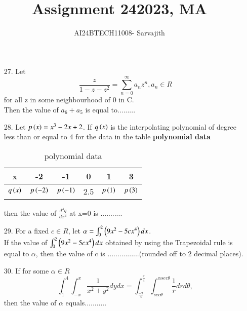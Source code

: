 \documentclass[journal]{IEEEtran}
\begin{document}

\vspace{3cm}


\author{AI24BTECH11008- Sarvajith
}
\title{Assignment 24}
{\let\newpage\relax\maketitle}
\title{2023, MA}
\renewcommand{\thefigure}{\theenumi}
\renewcommand{\thetable}{\theenumi}
\setlength{\intextsep}{10pt} %
\renewcommand{\thetable}{\theenumi}
\begin{enumerate}
    \item[27.] Let $$\frac{z}{1-z-z^2} = \sum_{n=0}^{\infty}a_nz^n, a_n \in R$$ for all z in some neighbourhood of 0 in C.\\ Then the value of $a_6+a_5$ is equal to......... 
    \item[28.] Let $p\left(x\right)=x^3-2x+2$. If $q\left(x\right)$ is the interpolating polynomial of degree less than or equal to 4 for the data in the table \textbf{polynomial data}\\
    \begin{table}
        \centering
        \begin{tabular}{|c|c|c|c|c|c|}
            \hline
            x & -2&-1&0&1&3\\ \hline
            $q\left(x\right)$&$p\left(-2\right)$&$p\left(-1\right)$&2.5&$p\left(1\right)$&$p\left(3\right)$\\ \hline
        \end{tabular} %
        \caption{polynomial data}
    \end{table}
    then the value of $\frac{d^4q}{dx^4}$ at x=0 is ...........
    \item[29.] For a fixed $c \in R$, let $\alpha = \int_{0}^{2}\left(9x^2-5cx^4\right)dx$.\\ If the value of $\int_{0}^{2}\left(9x^2-5cx^4\right)dx$ obtained by using the Trapezoidal rule is equal to $\alpha$, then the value of c is ................(rounded off to 2 decimal places).
    \item[30.] If for some $\alpha \in R$ $$\int_{1}^{4}\int_{-x}^{x}\frac{1}{x^2+y^2}dydx = \int_{\frac{-\pi}{4}}^{\frac{\pi}{4}}\int_{sec\theta}^{\alpha sec\theta}\frac{1}{r}drd\theta,$$ then the value of $\alpha$ equals...........

\end{enumerate}
\end{document}
